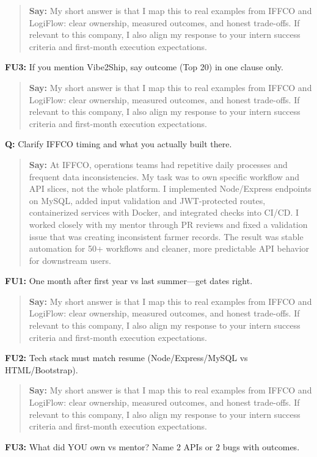 \documentclass[9pt,a4paper]{article}
\begin{document}
\begin{quote}\small\textbf{Say:} My short answer is that I map this to real examples from IFFCO and LogiFlow: clear ownership, measured outcomes, and honest trade-offs. If relevant to this company, I also align my response to your intern success criteria and first-month execution expectations.\end{quote}
\vspace{2mm}
\textbf{FU3:} If you mention Vibe2Ship, say outcome (Top 20) in one clause only.

\begin{quote}\small\textbf{Say:} My short answer is that I map this to real examples from IFFCO and LogiFlow: clear ownership, measured outcomes, and honest trade-offs. If relevant to this company, I also align my response to your intern success criteria and first-month execution expectations.\end{quote}
\vspace{2mm}
\textbf{Q:} Clarify IFFCO timing and what you actually built there.

\begin{quote}\small\textbf{Say:} At IFFCO, operations teams had repetitive daily processes and frequent data inconsistencies. My task was to own specific workflow and API slices, not the whole platform. I implemented Node/Express endpoints on MySQL, added input validation and JWT-protected routes, containerized services with Docker, and integrated checks into CI/CD. I worked closely with my mentor through PR reviews and fixed a validation issue that was creating inconsistent farmer records. The result was stable automation for 50+ workflows and cleaner, more predictable API behavior for downstream users.\end{quote}
\vspace{2mm}
\textbf{FU1:} One month after first year vs last summer---get dates right.

\begin{quote}\small\textbf{Say:} My short answer is that I map this to real examples from IFFCO and LogiFlow: clear ownership, measured outcomes, and honest trade-offs. If relevant to this company, I also align my response to your intern success criteria and first-month execution expectations.\end{quote}
\vspace{2mm}
\textbf{FU2:} Tech stack must match resume (Node/Express/MySQL vs HTML/Bootstrap).

\begin{quote}\small\textbf{Say:} My short answer is that I map this to real examples from IFFCO and LogiFlow: clear ownership, measured outcomes, and honest trade-offs. If relevant to this company, I also align my response to your intern success criteria and first-month execution expectations.\end{quote}
\vspace{2mm}
\textbf{FU3:} What did YOU own vs mentor? Name 2 APIs or 2 bugs with outcomes.
\end{document}
